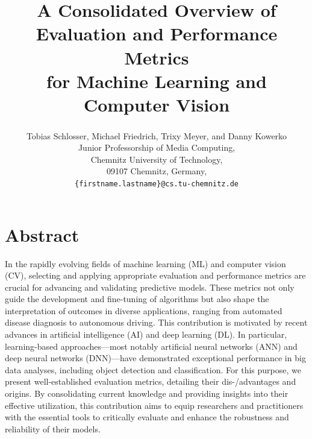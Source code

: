 \documentclass{article}
\newcommand{\ORCID}[1]{\textsuperscript{\href{https://orcid.org/#1}{\textcolor[HTML]{A6CE39}{\faOrcid}}}}
\newcommand{\ORCIDSchlosser}{0000-0002-0682-4284} %
\newcommand{\ORCIDFriedrich}{0000-0001-6326-4749} %
\newcommand{\ORCIDMeyer}{0000-0002-3372-1619}     %
\newcommand{\ORCIDKowerko}{0000-0002-4538-7814}   %
\begin{document}
\title{\Huge A Consolidated Overview of \\ Evaluation and Performance Metrics \\ for Machine Learning and Computer Vision}

\author{
    Tobias Schlosser\ORCID{\ORCIDSchlosser}, Michael Friedrich\ORCID{\ORCIDFriedrich}, Trixy Meyer\ORCID{\ORCIDMeyer}, and Danny Kowerko\ORCID{\ORCIDKowerko} \\[1ex]
    Junior Professorship of Media Computing, \\
    Chemnitz University of Technology, \\
    09107 Chemnitz, Germany, \\
    \texttt{\{firstname.lastname\}@cs.tu-chemnitz.de}
}




\maketitle




\section*{Abstract}

In the rapidly evolving fields of machine learning (ML) and computer vision (CV), selecting and applying appropriate evaluation and performance metrics are crucial for advancing and validating predictive models. These metrics not only guide the development and fine-tuning of algorithms but also shape the interpretation of outcomes in diverse applications, ranging from automated disease diagnosis to autonomous driving. This contribution is motivated by recent advances in artificial intelligence (AI) and deep learning (DL). In particular, learning-based approaches---most notably artificial neural networks (ANN) and deep neural networks (DNN)---have demonstrated exceptional performance in big data analyses, including object detection and classification. For this purpose, we present well-established evaluation metrics, detailing their dis-/advantages and origins. By consolidating current knowledge and providing insights into their effective utilization, this contribution aims to equip researchers and practitioners with the essential tools to critically evaluate and enhance the robustness and reliability of their models.
\end{document}

